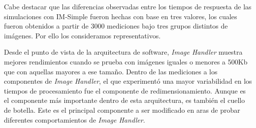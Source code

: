 Cabe destacar que las diferencias observadas entre los tiempos de respuesta de las simulaciones con IM-Simple fueron hechas con base en tres valores, los cuales fueron obtenidos a partir de 3000 mediciones bajo tres grupos distintos de imágenes. Por ello los consideramos representativos.

Desde el punto de vista de la arquitectura de software, \emph{Image Handler} muestra mejores rendimientos cuando se prueba con imágenes iguales o menores a 500Kb que con aquellas mayores a ese tamaño. Dentro de las mediciones a los componentes de \emph{Image Handler}, el que experimentó una mayor variabilidad en los tiempos de procesamiento fue el componente de redimensionamiento. Aunque es el componente más importante dentro de esta arquitectura, es también el cuello de botella. Este es el principal componente a ser modificado en aras de probar diferentes comportamientos de \emph{Image Handler}. 

